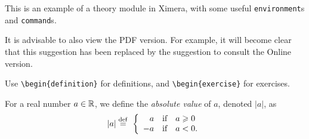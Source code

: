 \documentclass{ximera}
\begin{document}
    \author{Wim Obbels}
    \label{xim:ximeraDemo}

This is an example of a theory module in Ximera, 
with some useful \texttt{environment}s and \texttt{command}s.



\begin{onlineOnly}
 \begin{remark}
    It is advisable to also view the PDF version. 
    For example, it will become clear that this suggestion has been replaced by the suggestion to consult the Online version.
 \end{remark}
\end{onlineOnly}



Use \verb|\begin{definition}| for definitions, and \verb|\begin{exercise}| for exercises.

\begin{definition}\label{showcase:absolutevalue}\nl 

	For a real number $a\in\mathbb{R}$, we define the \textit{absolute value} of $a$, denoted $|a|$, as
	\[
		|a| \perdef\displaystyle\ 
		          \left\{
			\begin{array}{rll  } 
				a  & \mbox{if} & a \geq 0 \\
				-a & \mbox{if} & a<0.
			\end{array}\right.
	\]
\end{definition}
\end{document}
